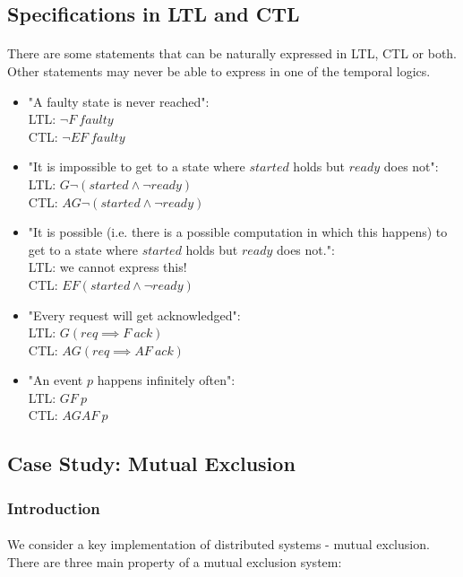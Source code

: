 \documentclass{article}
\theoremstyle{plain}
\theoremstyle{definition}
\begin{document}
\begin{multicols}{2}
\subsection{Specifications in LTL and CTL}

\paragraph{} There are some statements that can be naturally expressed in LTL, CTL or both. Other statements may never be able to express in one of the temporal logics.

\begin{itemize}
\item "A faulty state is never reached":\\ LTL: $\lnot F\ faulty$\\ CTL: $\lnot EF\ faulty$
\item "It is impossible to get to a state where $started$ holds but $ready$ does not":\\ LTL: $G\lnot(started \land \lnot ready)$\\ CTL: $AG\lnot(started \land \lnot ready)$
\item "It is possible (i.e. there is a possible computation in which this happens) to get to a state where $started$ holds but $ready$ does not.":\\ LTL: we cannot express this!\\CTL: $EF(started \land \lnot ready)$
\item "Every request will get acknowledged":\\ LTL: $G(req \implies F\ ack)$\\ CTL: $AG(req \implies AF\ ack)$
\item "An event $p$ happens infinitely often":\\ LTL: $GF\ p$\\ CTL: $AGAF\ p$
\end{itemize}

\subsection{Case Study: Mutual Exclusion}

\subsubsection{Introduction}

\paragraph{} We consider a key implementation of distributed systems - mutual exclusion. There are three main property of a mutual exclusion system:


\end{multicols}
\end{document}
